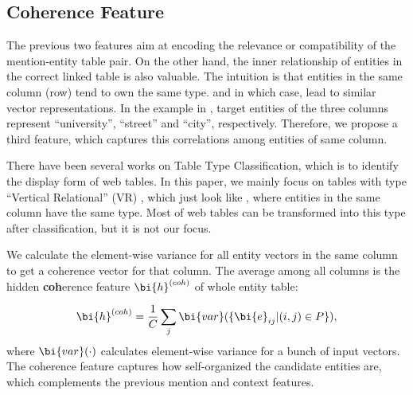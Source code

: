 \subsection{Coherence Feature}
\label{sec:coherence}

The previous two features aim at
encoding the relevance or compatibility of the mention-entity table pair.
On the other hand,
the inner relationship of entities in the correct linked table is also valuable.
The intuition is that entities in the same column (row) tend to own the same type.
and in which case, lead to similar vector representations.
In the example in , target entities of the three columns
represent ``university'', ``street'' and ``city'', respectively.
Therefore, we propose a third feature,
which captures this correlations among entities of same column. 




There have been several works \cite{eberius2015building,nishida2017understanding} on Table Type Classification,
which is to identify the display form of web tables.
In this paper, we mainly focus on tables with type ``Vertical Relational'' (VR) \cite{nishida2017understanding},
which just look like , where entities in the same column have the same type.
Most of web tables can be transformed into this type after classification, but it is not our focus.

We calculate the element-wise variance for all entity vectors in the same column
to get a coherence vector for that column.
The average among all columns is the hidden \textbf{coh}erence feature
$\bi{h}^{(coh)}$ of whole entity table:

\begin{equation}
  \label{eqn:coherence}
    \bi{h}^{(coh)} = \frac{1}{C} \sum_{j} \bi{var}(\{\bi{e}_{ij} | (i,j) \in P \}),
\end{equation}
\noindent
where $\bi{var}(\cdot)$ calculates element-wise variance for a bunch of input vectors.
The coherence feature captures how self-organized the candidate entities are,
which complements the previous mention and context features.
